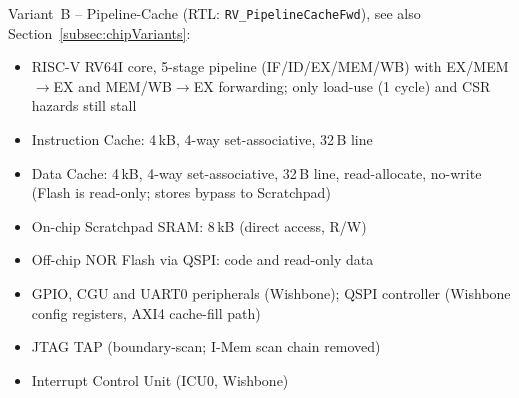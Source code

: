 Variant~B -- Pipeline-Cache (RTL: \texttt{RV\_PipelineCacheFwd}), see also Section~\ref{subsec:chipVariants}:
\begin{itemize}
  \item RISC-V RV64I core, 5-stage pipeline (IF/ID/EX/MEM/WB) with
        EX/MEM$\to$EX and MEM/WB$\to$EX forwarding; only load-use (1 cycle)
        and CSR hazards still stall
  \item Instruction Cache: 4\,kB, 4-way set-associative, 32\,B line
  \item Data Cache: 4\,kB, 4-way set-associative, 32\,B line,
        read-allocate, no-write (Flash is read-only; stores bypass to Scratchpad)
  \item On-chip Scratchpad SRAM: 8\,kB (direct access, R/W)
  \item Off-chip NOR Flash via QSPI: code and read-only data
  \item GPIO, CGU and UART0 peripherals (Wishbone); QSPI controller
        (Wishbone config registers, AXI4 cache-fill path)
  \item JTAG TAP (boundary-scan; I-Mem scan chain removed)
  \item Interrupt Control Unit (ICU0, Wishbone)
\end{itemize}
